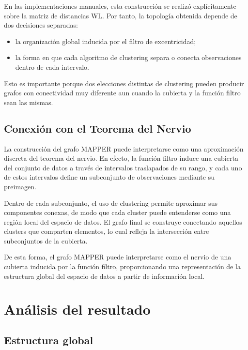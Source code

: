 \documentclass[12pt]{article}
\begin{document}
En las implementaciones manuales, esta construcci\'on se realiz\'o expl\'icitamente sobre la matriz de distancias WL. Por tanto, la topolog\'ia obtenida depende de dos decisiones separadas:

\begin{itemize}
    \item la organizaci\'on global inducida por el filtro de excentricidad;
    \item la forma en que cada algoritmo de clustering separa o conecta observaciones dentro de cada intervalo.
\end{itemize}

Esto es importante porque dos elecciones distintas de clustering pueden producir grafos con conectividad muy diferente aun cuando la cubierta y la funci\'on filtro sean las mismas.

\subsection{Conexión con el Teorema del Nervio}

La construcción del grafo MAPPER puede interpretarse como una aproximación discreta del teorema del nervio. En efecto, la función filtro induce una cubierta del conjunto de datos a través de intervalos traslapados de su rango, y cada uno de estos intervalos define un subconjunto de observaciones mediante su preimagen.

Dentro de cada subconjunto, el uso de clustering permite aproximar sus componentes conexas, de modo que cada cluster puede entenderse como una región local del espacio de datos. El grafo final se construye conectando aquellos clusters que comparten elementos, lo cual refleja la intersección entre subconjuntos de la cubierta.

De esta forma, el grafo MAPPER puede interpretarse como el nervio de una cubierta inducida por la función filtro, proporcionando una representación de la estructura global del espacio de datos a partir de información local.

\section{An\'alisis del resultado}

\subsection{Estructura global}
\end{document}

